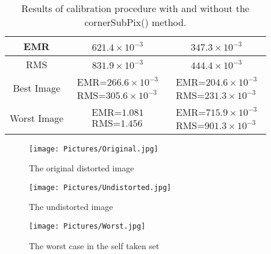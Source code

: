 \documentclass[11pt,a4paper]{article}
\newcommand{\cc}{\fontfamily{txtt}\selectfont}
\begin{document}
\begin{center}
\begin{table}[ht]
\begin{tabular}{|c | c c|}
     \hline
     EMR & $621.4\times 10^{-3}$& $347.3\times 10^{-3}$\\
     \hline
     RMS & $831.9\times 10^{-3}$& $444.4\times 10^{-3}$\\
     \hline
     Best Image & $\begin{matrix}\text{EMR=} 266.6\times 10^{-3}\\ \text{RMS=} 305.6\times 10^{-3}\end{matrix}$ & $\begin{matrix}\text{EMR=} 204.6\times 10^{-3}\\ \text{RMS=} 231.3\times 10^{-3}\end{matrix}$\\
     \hline
     Worst Image & $\begin{matrix}\text{EMR=} 1.081\\ \text{RMS=} 1.456\end{matrix}$ & $\begin{matrix}\text{EMR=} 715.9\times 10^{-3}\\ \text{RMS=} 901.3\times 10^{-3}\end{matrix}$\\
     \hline
    \end{tabular}
  \caption{Results of calibration procedure with and without the {\cc cornerSubPix()} method.}
  \label{Table:values}
  \end{table}
  \begin{figure}[ht]
    \texttt{[image: Pictures/Original.jpg]}
    \caption{The original distorted image}
  \end{figure}  
  \begin{figure}[ht]
    \texttt{[image: Pictures/Undistorted.jpg]}
    \caption{The undistorted image}
  \end{figure}
  \begin{figure}[ht]
    \texttt{[image: Pictures/Worst.jpg]}
    \caption{The worst case in the self taken set}
  \end{figure}
\end{center}
\end{document}

